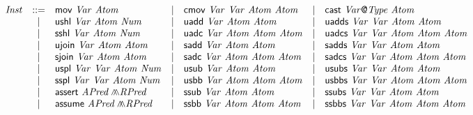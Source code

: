 \begin{figure*}
\begin{math}
\begin{array}{rclclcl}
      \mathit{Inst} & ::= &
            \clMov\ \mathit{Var}\ \mathit{Atom}
      & | & \clCmov\ \mathit{Var}\ \mathit{Var}\
            \mathit{Atom}\ \mathit{Atom}
      & | & \clVPCast\ \mathit{Var}\mytextsf{@}\mathit{Type}\ \mathit{Atom}\\
      & | & \clUShl\ \mathit{Var}\ \mathit{Atom}\ \mathit{Num}
      & | & \clUAdd\ \mathit{Var}\ \mathit{Atom}\ \mathit{Atom}
      & | & \clUAdds\ \mathit{Var}\ \mathit{Var}\
            \mathit{Atom}\ \mathit{Atom}\\
      & | & \clSShl\ \mathit{Var}\ \mathit{Atom}\ \mathit{Num}
      & | & \clUAdc\ \mathit{Var}\ \mathit{Atom}\
            \mathit{Atom}\ \mathit{Atom}
      & | & \clUAdcs\ \mathit{Var}\ \mathit{Var}\
            \mathit{Atom}\ \mathit{Atom}\ \mathit{Atom}\\
      & | & \clUJoin\ \mathit{Var}\ \mathit{Atom}\ \mathit{Atom}
      & | & \clSAdd\ \mathit{Var}\ \mathit{Atom}\ \mathit{Atom}
      & | & \clSAdds\ \mathit{Var}\ \mathit{Var}\
            \mathit{Atom}\ \mathit{Atom}\\
      & | & \clSJoin\ \mathit{Var}\ \mathit{Atom}\ \mathit{Atom}
      & | & \clSAdc\ \mathit{Var}\ \mathit{Atom}\
            \mathit{Atom}\ \mathit{Atom}
      & | & \clSAdcs\ \mathit{Var}\ \mathit{Var}\
            \mathit{Atom}\ \mathit{Atom}\ \mathit{Atom}\\
      & | & \clUSplit\ \mathit{Var}\ \mathit{Var}\
            \mathit{Atom}\ \mathit{Num}
      & | & \clUSub\ \mathit{Var}\ \mathit{Atom}\ \mathit{Atom}
      & | & \clUSubs\ \mathit{Var}\ \mathit{Var}\
            \mathit{Atom}\ \mathit{Atom}\\
      & | & \clSSplit\ \mathit{Var}\ \mathit{Var}\
            \mathit{Atom}\ \mathit{Num}
      & | & \clUSbb\ \mathit{Var}\ \mathit{Atom}\
            \mathit{Atom}\ \mathit{Atom}
      & | & \clUSbbs\ \mathit{Var}\ \mathit{Var}\
            \mathit{Atom}\ \mathit{Atom}\ \mathit{Atom}\\
      & | & \clAssert\ \mathit{APred} \clConj \mathit{RPred}
      & | & \clSSub\ \mathit{Var}\ \mathit{Atom}\ \mathit{Atom}
      & | & \clSSubs\ \mathit{Var}\ \mathit{Var}\
            \mathit{Atom}\ \mathit{Atom}\\
      & | & \clAssume\ \mathit{APred} \clConj \mathit{RPred}
      & | & \clSSbb\ \mathit{Var}\ \mathit{Atom}\
            \mathit{Atom}\ \mathit{Atom}
      & | & \clSSbbs\ \mathit{Var}\ \mathit{Var}\
            \mathit{Atom}\ \mathit{Atom}\ \mathit{Atom}\\

\end{array}
\end{math}
\end{figure*}
